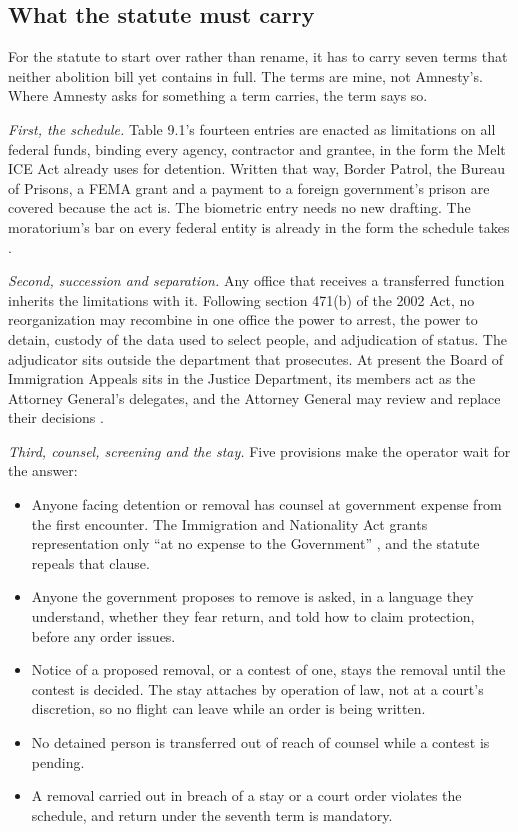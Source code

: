 \subsection{What the statute must carry}
\label{sec:9.4.5}
For the statute to start over rather than rename, it has to carry seven terms that neither abolition bill yet contains in full. The terms are mine, not Amnesty's. Where Amnesty asks for something a term carries, the term says so.

\emph{First, the schedule.} Table 9.1's fourteen entries are enacted as limitations on all federal funds, binding every agency, contractor and grantee, in the form the Melt ICE Act already uses for detention. Written that way, Border Patrol, the Bureau of Prisons, a FEMA grant and a payment to a foreign government's prison are covered because the act is. The biometric entry needs no new drafting. The moratorium's bar on every federal entity is already in the form the schedule takes \autocite{Jayapal2026Moratorium}.

\emph{Second, succession and separation.} Any office that receives a transferred function inherits the limitations with it. Following section 471(b) of the 2002 Act, no reorganization may recombine in one office the power to arrest, the power to detain, custody of the data used to select people, and adjudication of status. The adjudicator sits outside the department that prosecutes. At present the Board of Immigration Appeals sits in the Justice Department, its members act as the Attorney General's delegates, and the Attorney General may review and replace their decisions \autocite{cfr1003_1}.

\emph{Third, counsel, screening and the stay.} Five provisions make the operator wait for the answer:

\begin{itemize}
\item Anyone facing detention or removal has counsel at government expense from the first encounter. The Immigration and Nationality Act grants representation only “at no expense to the Government” \autocite{usc1362}, and the statute repeals that clause.
\item Anyone the government proposes to remove is asked, in a language they understand, whether they fear return, and told how to claim protection, before any order issues.
\item Notice of a proposed removal, or a contest of one, stays the removal until the contest is decided. The stay attaches by operation of law, not at a court's discretion, so no flight can leave while an order is being written.
\item No detained person is transferred out of reach of counsel while a contest is pending.
\item A removal carried out in breach of a stay or a court order violates the schedule, and return under the seventh term is mandatory.
\end{itemize}

